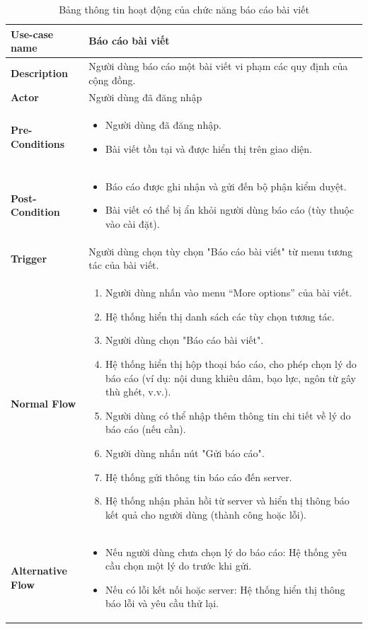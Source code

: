 \begin{longtable}{|>{\bfseries}m{4cm}|m{10cm}|}
    \caption{Bảng thông tin hoạt động của chức năng báo cáo bài viết}
    \label{table:usecase-report}\\
\hline
Use-case name & Báo cáo bài viết \\
\hline
Description & Người dùng báo cáo một bài viết vi phạm các quy định của cộng đồng. \\
\hline
Actor & Người dùng đã đăng nhập \\
\hline
Pre-Conditions & 
\begin{itemize}
    \item Người dùng đã đăng nhập.
    \item Bài viết tồn tại và được hiển thị trên giao diện.
\end{itemize} \\
\hline
Post-Condition & 
\begin{itemize}
    \item Báo cáo được ghi nhận và gửi đến bộ phận kiểm duyệt.
    \item Bài viết có thể bị ẩn khỏi người dùng báo cáo (tùy thuộc vào cài đặt).
\end{itemize} \\
\hline
Trigger & Người dùng chọn tùy chọn "Báo cáo bài viết" từ menu tương tác của bài viết. \\
\hline
Normal Flow &
\begin{enumerate}
    \item Người dùng nhấn vào menu “More options” của bài viết.
    \item Hệ thống hiển thị danh sách các tùy chọn tương tác.
    \item Người dùng chọn "Báo cáo bài viết".
    \item Hệ thống hiển thị hộp thoại báo cáo, cho phép chọn lý do báo cáo (ví dụ: nội dung khiêu dâm, bạo lực, ngôn từ gây thù ghét, v.v.).
    \item Người dùng có thể nhập thêm thông tin chi tiết về lý do báo cáo (nếu cần).
    \item Người dùng nhấn nút "Gửi báo cáo".
    \item Hệ thống gửi thông tin báo cáo đến server.
    \item Hệ thống nhận phản hồi từ server và hiển thị thông báo kết quả cho người dùng (thành công hoặc lỗi).
\end{enumerate} \\
\hline
Alternative Flow &
\begin{itemize}
    \item Nếu người dùng chưa chọn lý do báo cáo: Hệ thống yêu cầu chọn một lý do trước khi gửi.
    \item Nếu có lỗi kết nối hoặc server: Hệ thống hiển thị thông báo lỗi và yêu cầu thử lại.
\end{itemize} \\
\hline
\end{longtable}

